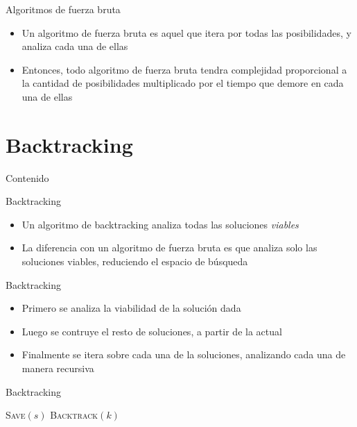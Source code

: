 \documentclass[handout]{beamer}
\begin{document}
\begin{frame}{Algoritmos de fuerza bruta}
  \begin{itemize}
    \item Un algoritmo de fuerza bruta es aquel que itera por todas las posibilidades, y analiza cada una de ellas
      \pause
    \item Entonces, todo algoritmo de fuerza bruta tendra complejidad proporcional a la cantidad de posibilidades multiplicado por el tiempo que demore en cada una de ellas
  \end{itemize}
\end{frame}

\section{Backtracking}
\begin{frame}{Contenido}
\tableofcontents[currentsection]
\end{frame}

\begin{frame}{Backtracking}
  \begin{itemize}
    \item Un algoritmo de backtracking analiza todas las soluciones \textit{viables}
      \pause
    \item La diferencia con un algoritmo de fuerza bruta es que analiza solo las soluciones viables, reduciendo el espacio de b\'usqueda
  \end{itemize}
\end{frame}

\begin{frame}{Backtracking}
  \begin{itemize}
    \item Primero se analiza la viabilidad de la soluci\'on dada
      \pause
    \item Luego se contruye el resto de soluciones, a partir de la actual
      \pause
    \item Finalmente se itera sobre cada una de la soluciones, analizando cada una de manera recursiva
  \end{itemize}
\end{frame}

\begin{frame}{Backtracking}
  \begin{algorithm}[H]
    \BlankLine
    {
      \Return
    }
    {
      \textsc{Save}$(s)$ 
      \Return
    }
    {
      \textsc{Backtrack}$(k)$
    }
  \end{algorithm}
\end{frame}
\end{document}

